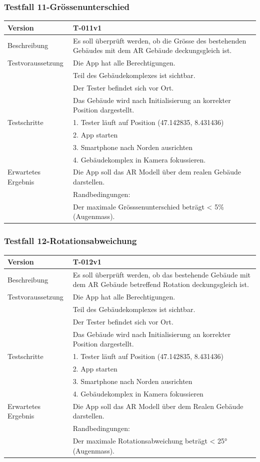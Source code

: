 \documentclass[a4paper]{scrreprt}
\begin{document}
\subsubsection{Testfall 11-Grössenunterschied}
\begin{tabularx}{\textwidth}{|l|X|}
\hline 
	Version &
	T-011v1 \\ 
\hline 
	Beschreibung & 
	Es soll überprüft werden, ob die Grösse des bestehenden Gebäudes mit dem AR Gebäude deckungsgleich ist. \\ 
\hline
    Testvoraussetzung &
	Die App hat alle Berechtigungen.\\ &
	Teil des Gebäudekomplexes ist sichtbar.\\ &
	Der Tester befindet sich vor Ort. \\ &
	Das Gebäude wird nach Initialisierung an korrekter Position dargestellt. \\
\hline 
	Testschritte & 
		1. Tester läuft auf Position (47.142835, 8.431436)\\ &
		2. App starten\\ &
		3. Smartphone nach Norden ausrichten\\ &
		4. Gebäudekomplex in Kamera fokussieren. \\
\hline
	Erwartetes Ergebnis &
	Die App soll das AR Modell über dem realen Gebäude darstellen. \\ &
	Randbedingungen: \\ &
		Der maximale Grösssenunterschied beträgt < 5\% (Augenmass). \\ 
\hline 
\end{tabularx}
\subsubsection{Testfall 12-Rotationsabweichung}
\begin{tabularx}{\textwidth}{|l|X|}
\hline 
	Version &
	T-012v1 \\ 
\hline 
	Beschreibung & 
	Es soll überprüft werden, ob das bestehende Gebäude mit dem AR Gebäude betreffend Rotation deckungsgleich ist. \\ 
\hline 
	Testvoraussetzung &
	Die App hat alle Berechtigungen. \\ &
	Teil des Gebäudekomplexes ist sichtbar. \\ &
	Der Tester befindet sich vor Ort. \\ &
	Das Gebäude wird nach Initialisierung an korrekter Position dargestellt. \\
\hline 
	Testschritte & 
		1. Tester läuft auf Position (47.142835, 8.431436)\\ &
		2. App starten\\ &
		3. Smartphone nach Norden ausrichten\\ &
		4. Gebäudekomplex in Kamera fokussieren\\
\hline
	Erwartetes Ergebnis &
	Die App soll das AR Modell über dem Realen Gebäude darstellen. \\ &
	Randbedingungen: \\ &
		Der maximale Rotationsabweichung beträgt < \ang{25} (Augenmass). \\ 
\hline 
\end{tabularx}
\end{document}
